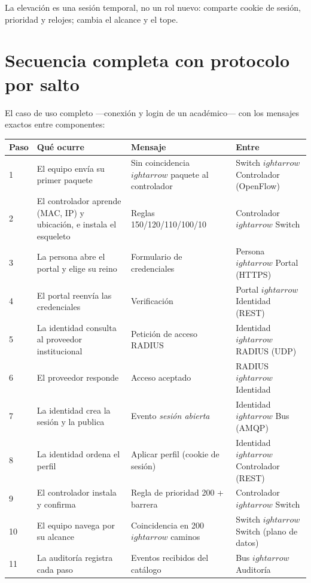 \documentclass[11pt,a4paper]{article}
\begin{document}
La elevación es una sesión temporal, no un rol nuevo: comparte cookie de sesión, prioridad y relojes; cambia el alcance y el tope.

\section{Secuencia completa con protocolo por salto}

El caso de uso completo ---conexión y login de un académico--- con los mensajes exactos entre componentes:

\begin{longtable}{p{1.2cm}p{4.8cm}p{4.4cm}p{3.6cm}}
\toprule
\textbf{Paso} & \textbf{Qué ocurre} & \textbf{Mensaje} & \textbf{Entre}\\
\midrule
1 & El equipo envía su primer paquete & Sin coincidencia $
ightarrow$ paquete al controlador & Switch $
ightarrow$ Controlador (OpenFlow)\\
2 & El controlador aprende (MAC, IP) y ubicación, e instala el esqueleto & Reglas 150/120/110/100/10 & Controlador $
ightarrow$ Switch\\
3 & La persona abre el portal y elige su reino & Formulario de credenciales & Persona $
ightarrow$ Portal (HTTPS)\\
4 & El portal reenvía las credenciales & Verificación & Portal $
ightarrow$ Identidad (REST)\\
5 & La identidad consulta al proveedor institucional & Petición de acceso RADIUS & Identidad $
ightarrow$ RADIUS (UDP)\\
6 & El proveedor responde & Acceso aceptado & RADIUS $
ightarrow$ Identidad\\
7 & La identidad crea la sesión y la publica & Evento \emph{sesión abierta} & Identidad $
ightarrow$ Bus (AMQP)\\
8 & La identidad ordena el perfil & Aplicar perfil (cookie de sesión) & Identidad $
ightarrow$ Controlador (REST)\\
9 & El controlador instala y confirma & Regla de prioridad 200 + barrera & Controlador $
ightarrow$ Switch\\
10 & El equipo navega por su alcance & Coincidencia en 200 $
ightarrow$ caminos & Switch $
ightarrow$ Switch (plano de datos)\\
11 & La auditoría registra cada paso & Eventos recibidos del catálogo & Bus $
ightarrow$ Auditoría\\
\bottomrule
\end{longtable}
\end{document}
